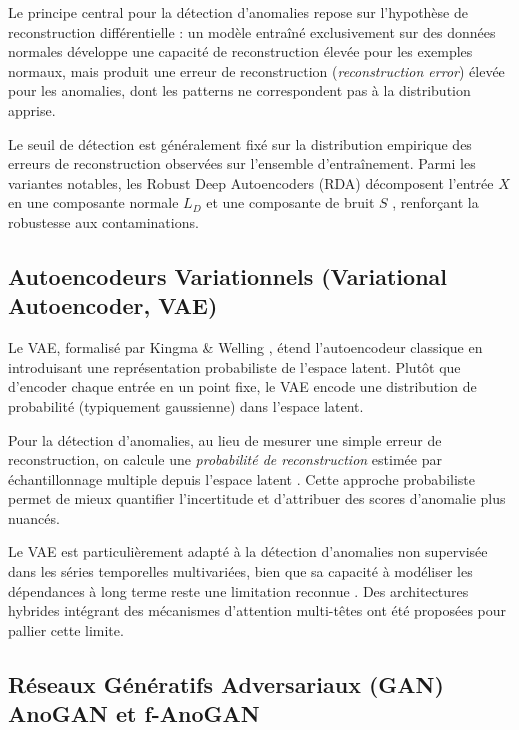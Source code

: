 \documentclass[12pt, a4paper]{article}
\begin{document}
Le principe central pour la détection d'anomalies repose sur l'hypothèse
de reconstruction différentielle : un modèle entraîné exclusivement sur
des données normales développe une capacité de reconstruction élevée pour
les exemples normaux, mais produit une erreur de reconstruction
(\textit{reconstruction error}) élevée pour les anomalies, dont les
patterns ne correspondent pas à la distribution apprise.

Le seuil de détection est généralement fixé sur la distribution empirique
des erreurs de reconstruction observées sur l'ensemble d'entraînement.
Parmi les variantes notables, les Robust Deep Autoencoders (RDA) décomposent
l'entrée $X$ en une composante normale $L_D$ et une composante de bruit $S$
\cite{zhou2017anomaly}, renforçant la robustesse aux contaminations.



\subsection{Autoencodeurs Variationnels (Variational Autoencoder, VAE)}

Le VAE, formalisé par Kingma \& Welling \cite{kingma2013auto}, étend
l'autoencodeur classique en introduisant une représentation probabiliste
de l'espace latent. Plutôt que d'encoder chaque entrée en un point fixe,
le VAE encode une distribution de probabilité (typiquement gaussienne)
dans l'espace latent.

Pour la détection d'anomalies, au lieu de mesurer une simple erreur de
reconstruction, on calcule une \textit{probabilité de reconstruction}
estimée par échantillonnage multiple depuis l'espace latent \cite{an2015vae}.
Cette approche probabiliste permet de mieux quantifier l'incertitude et
d'attribuer des scores d'anomalie plus nuancés.

Le VAE est particulièrement adapté à la détection d'anomalies non supervisée
dans les séries temporelles multivariées, bien que sa capacité à modéliser
les dépendances à long terme reste une limitation reconnue \cite{shap2025}.
Des architectures hybrides intégrant des mécanismes d'attention
multi-têtes ont été proposées pour pallier cette limite.



\subsection{Réseaux Génératifs Adversariaux (GAN)  AnoGAN et f-AnoGAN}
\end{document}
